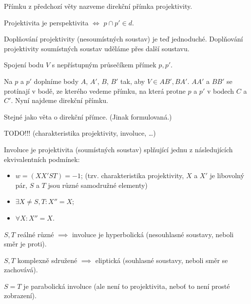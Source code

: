 \documentclass[12pt]{article}					%
\begin{document}
\begin{definice}
	Přímku z předchozí věty nazveme direkční přímka projektivity.
\end{definice}

\begin{poznamka}
	Projektivita je perspektivita $\Leftrightarrow$ $p \cap p' \in d$.
\end{poznamka}

\begin{priklad}
	Doplňování projektivity (nesoumístných soustav) je teď jednoduché. Doplňování projektivity soumístných soustav uděláme přes další soustavu.
\end{priklad}

\begin{priklad}
	Spojení bodu $V$ s nepřístupným průsečíkem přímek $p, p'$.

	\begin{reseni}
		Na $p$ a $p'$ doplníme body $A$, $A'$, $B$, $B'$ tak, aby $V \in AB', BA'$. $AA'$ a $BB'$ se protínají v bodě, ze kterého vedeme přímku, na která protne $p$ a $p'$ v bodech $C$ a $C'$. Nyní najdeme direkční přímku.
	\end{reseni}
\end{priklad}

\begin{veta}
	Stejné jako věta o direkční přímce. (Jinak formulovaná.)
\end{veta}


TODO!!! (charakteristika projektivity, involuce, …)

\begin{definice}[Involuce]
	Involuce je projektivita (soumístných soustav) splňující jednu z následujících ekvivalentních podmínek:
	\begin{itemize}
		\item $w = (XX'ST) = -1$; (tzv. charakteristika projektivity, $X$ a $X'$ je libovolný pár, $S$ a $T$ jsou různé samodružné elementy)
		\item $\exists X ≠ S, T: X'' = X$;
		\item $\forall X: X'' = X$.
	\end{itemize}
\end{definice}

\begin{definice}
	$S, T$ reálné různé $\implies$ involuce je hyperbolická (nesouhlasné soustavy, neboli směr je proti).

	$S, T$ komplexně sdružené $\implies$ eliptická (souhlasné soustavy, neboli směr se zachovává).

	\begin{poznamka}
		$S = T$ je parabolická involuce (ale není to projektivita, neboť to není prosté zobrazení).
	\end{poznamka}
\end{definice}
\end{document}
